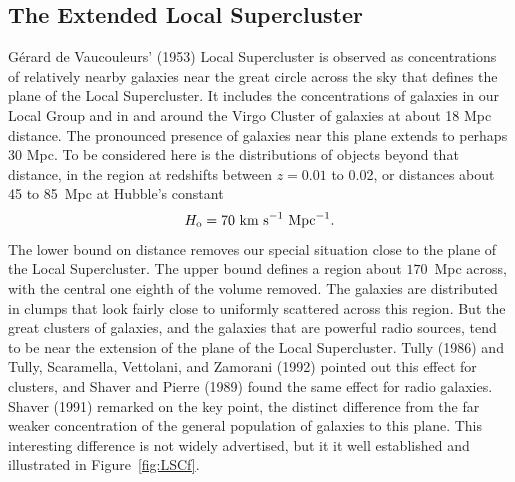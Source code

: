\documentclass[fleqn,usenatbib]{mnras}
\newcommand{\beq}{\begin{equation}}
\newcommand{\eeq}{\end{equation}}
\begin{document}
\subsection{The Extended Local Supercluster}\label{sec:LSC} 

G\'erard de Vaucouleurs' (1953) Local Supercluster is observed as concentrations of relatively nearby galaxies near the great circle across the sky that defines the plane of the Local Supercluster. It includes the concentrations of galaxies in our Local Group and in and around the Virgo Cluster of galaxies at about 18 Mpc distance. The pronounced presence of galaxies near this plane extends to perhaps 30 Mpc. To be considered here is the distributions of objects beyond that distance, in the region at redshifts between $z=0.01$ to 0.02, or distances about 45 to 85~Mpc at Hubble's constant
\beq
H_{\rm o} = 70\hbox{ km s}^{-1}\hbox{ Mpc}^{-1}.
\eeq 
The lower bound on distance removes our special situation close to the plane of the Local Supercluster. The upper bound defines a region about $170$~Mpc across, with the central one eighth of the volume removed. The galaxies are distributed in clumps that look fairly close to uniformly scattered across this region. But the great clusters of galaxies, and the galaxies that are powerful radio sources, tend to be near the extension of the plane of the Local Supercluster. Tully (1986) and Tully, Scaramella, Vettolani, and Zamorani (1992) pointed out this effect for clusters, and Shaver and Pierre (1989) found the same effect for radio galaxies. Shaver (1991) remarked on the key point, the distinct difference from the far weaker concentration of the general population of galaxies to this plane. This interesting difference is not widely advertised, but it it well established and illustrated in Figure~\ref{fig:LSCf}. 
\end{document}

